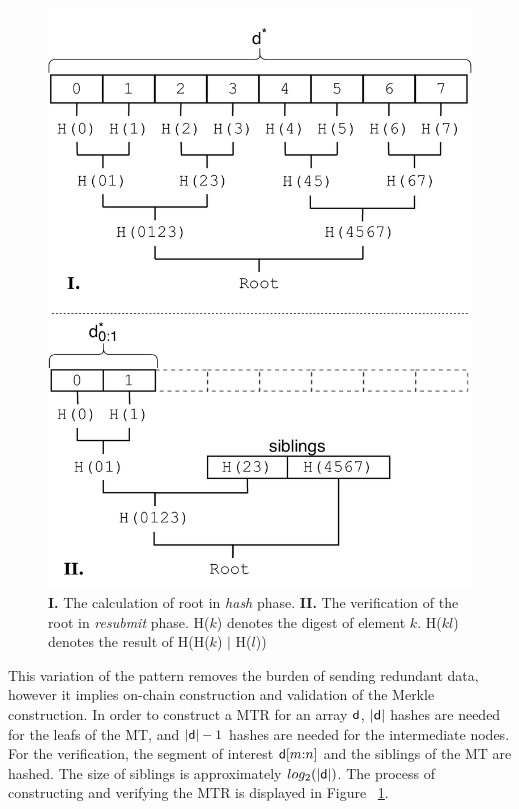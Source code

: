 \begin{figure}[h]
    \vspace*{-5mm}
    \begin{center}
        \includegraphics[width=0.8\linewidth]{figures/merkle-har.pdf}
    \end{center}
    \vspace*{-5mm}
    \caption{\textbf{I.} The calculation of root in \emph{hash} phase.
    \textbf{II.} The verification of the root in \emph{resubmit} phase.
    \textsf{H}($k$) denotes the digest of element $k$. \textsf{H}($kl$) denotes the
    result of \textsf{H}(\textsf{H}($k$) $|$ \textsf{H}($l$))}
    \label{fig:merkle-har}
    \vspace*{-4mm}
\end{figure}

This variation of the pattern removes the burden of sending redundant data,
however it implies on-chain construction and validation of the Merkle
construction. In order to construct a MTR for an array $\mathsf{d}$,
$|\mathsf{d}|$ hashes are needed for the leafs of the MT, and $|\mathsf{d}| -
1$ hashes are needed for the intermediate nodes. For the verification, the
segment of interest $\mathsf{d}[m{:}n]$ and the siblings of the MT are hashed.
The size of siblings is approximately $log_2(|\mathsf{d}|)$. The process of
constructing and verifying the MTR is displayed in Figure
~\ref{fig:merkle-har}.

